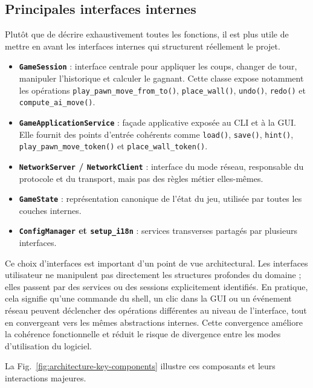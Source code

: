 \subsection{Principales interfaces internes}

Plutôt que de décrire exhaustivement toutes les fonctions, il est plus utile
de mettre en avant les interfaces internes qui structurent réellement le
projet.

\begin{itemize}
  \item \textbf{\texttt{GameSession}} : interface centrale pour appliquer les
    coups, changer de tour, manipuler l'historique et calculer le gagnant.
    Cette classe expose notamment les opérations
    \texttt{play\_pawn\_move\_from\_to()}, \texttt{place\_wall()},
    \texttt{undo()}, \texttt{redo()} et \texttt{compute\_ai\_move()}.
  \item \textbf{\texttt{GameApplicationService}} : façade applicative exposée
    au CLI et à la GUI. Elle fournit des points d'entrée cohérents comme
    \texttt{load()}, \texttt{save()}, \texttt{hint()},
    \texttt{play\_pawn\_move\_token()} et \texttt{place\_wall\_token()}.
  \item \textbf{\texttt{NetworkServer} / \texttt{NetworkClient}} : interface du
    mode réseau, responsable du protocole et du transport, mais pas des règles
    métier elles-mêmes.
  \item \textbf{\texttt{GameState}} : représentation canonique de l'état du
    jeu, utilisée par toutes les couches internes.
  \item \textbf{\texttt{ConfigManager} et \texttt{setup\_i18n}} : services
    transverses partagés par plusieurs interfaces.
\end{itemize}

Ce choix d'interfaces est important d'un point de vue architectural. Les
interfaces utilisateur ne manipulent pas directement les structures profondes
du domaine ; elles passent par des services ou des sessions explicitement
identifiés. En pratique, cela signifie qu'une commande du shell, un clic dans
la GUI ou un événement réseau peuvent déclencher des opérations différentes au
niveau de l'interface, tout en convergeant vers les mêmes abstractions
internes. Cette convergence améliore la cohérence fonctionnelle et réduit le
risque de divergence entre les modes d'utilisation du logiciel.

La Fig.~\ref{fig:architecture-key-components} illustre ces composants et leurs
interactions majeures.

